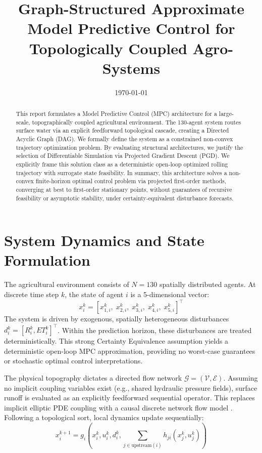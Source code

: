 \documentclass[11pt, a4paper]{article}
\title{\textbf{Graph-Structured Approximate Model Predictive Control for Topologically Coupled Agro-Systems}}
\author{} %
\date{\today}
\begin{document}
\maketitle

\begin{abstract}
This report formulates a Model Predictive Control (MPC) architecture for a large-scale, topographically coupled agricultural environment. The 130-agent system routes surface water via an explicit feedforward topological cascade, creating a Directed Acyclic Graph (DAG). We formally define the system as a constrained non-convex trajectory optimization problem. By evaluating structural architectures, we justify the selection of Differentiable Simulation via Projected Gradient Descent (PGD). We explicitly frame this solution class as a deterministic open-loop optimized rolling trajectory with surrogate state feasibility. In summary, this architecture solves a non-convex finite-horizon optimal control problem via projected first-order methods, converging at best to first-order stationary points, without guarantees of recursive feasibility or asymptotic stability, under certainty-equivalent disturbance forecasts.
\end{abstract}

\section{System Dynamics and State Formulation}
\label{sec:dynamics}
The agricultural environment consists of $N = 130$ spatially distributed agents. At discrete time step $k$, the state of agent $i$ is a 5-dimensional vector:
\begin{equation}
    x_{i}^k = [x_{1,i}^k,\; x_{2,i}^k,\; x_{3,i}^k,\; x_{4,i}^k,\; x_{5,i}^k]^\top
\end{equation}
The system is driven by exogenous, spatially heterogeneous disturbances $d^k_i = [R^k_i, ET^k_i]^\top$. Within the prediction horizon, these disturbances are treated deterministically. This strong Certainty Equivalence assumption yields a deterministic open-loop MPC approximation, providing no worst-case guarantees or stochastic optimal control interpretations.

The physical topography dictates a directed flow network $\mathcal{G} = (\mathcal{V}, \mathcal{E})$. Assuming no implicit coupling variables exist (e.g., shared hydraulic pressure fields), surface runoff is evaluated as an explicitly feedforward sequential operator. This replaces implicit elliptic PDE coupling with a causal discrete network flow model . Following a topological sort, local dynamics update sequentially:
\begin{equation}
    x_i^{k+1} = g_i\left(x_i^k, u_i^k, d_i^k, \sum_{j \in \text{upstream}(i)} h_{ji}(x_j^k, u_j^k)\right)
\end{equation}
\end{document}
